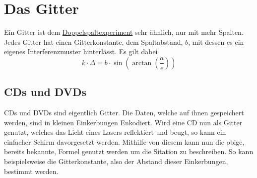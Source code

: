 \documentclass{article}
\begin{document}
\section{Das Gitter}
Ein Gitter ist dem \hyperref[Das Doppelspaltexperiment]{Doppelspaltexperiment} sehr ähnlich, nur mit mehr Spalten. Jedes Gitter hat einen Gitterkonstante, dem Spaltabstand, $b$, mit dessen es ein eigenes Interferenzmuster hinterlässt. Es gilt dabei
\[
 k \cdot \Delta = b \cdot \sin{\left(\arctan{\left(\frac{a}{e}\right)}\right)}
\]
 
\subsection{CDs und DVDs} 
\begin{minipage}{\dimexpr\linewidth-4cm}
CDs und DVDs sind eigentlich Gitter. Die Daten, welche auf ihnen gespeichert werden, sind in kleinen Einkerbungen Enkodiert. Wird eine CD nun als Gitter genutzt, welches das Licht eines Lasers reflektiert und beugt, so kann ein einfacher Schirm davorgesetzt werden. Mithilfe von diesem kann nun die obige, bereits bekannte, Formel genutzt werden um die Sitation zu beschreiben. So kann beispielsweise die Gitterkonstante, also der Abstand dieser Einkerbungen, bestimmt werden.
\end{minipage}
\hfill
\begin{minipage}{4cm}
 \center
\end{minipage} 
\end{document}
